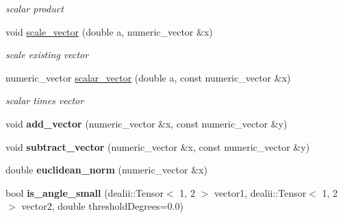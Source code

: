 \begin{DoxyCompactItemize}
\begin{DoxyCompactList}\small\item\em scalar product \item\end{DoxyCompactList}\item 
\hypertarget{namespacenatrium_1_1Math_a951fe967a78de6add632ac1944465bf3}{
void \hyperlink{namespacenatrium_1_1Math_a951fe967a78de6add632ac1944465bf3}{scale\_\-vector} (double a, numeric\_\-vector \&x)}
\label{namespacenatrium_1_1Math_a951fe967a78de6add632ac1944465bf3}

\begin{DoxyCompactList}\small\item\em scale existing vector \item\end{DoxyCompactList}\item 
\hypertarget{namespacenatrium_1_1Math_af6c85a423e8c6ec87858a3d48669a271}{
numeric\_\-vector \hyperlink{namespacenatrium_1_1Math_af6c85a423e8c6ec87858a3d48669a271}{scalar\_\-vector} (double a, const numeric\_\-vector \&x)}
\label{namespacenatrium_1_1Math_af6c85a423e8c6ec87858a3d48669a271}

\begin{DoxyCompactList}\small\item\em scalar times vector \item\end{DoxyCompactList}\item 
\hypertarget{namespacenatrium_1_1Math_adce2097ce0c14661aac3eaff3a03e183}{
void {\bfseries add\_\-vector} (numeric\_\-vector \&x, const numeric\_\-vector \&y)}
\label{namespacenatrium_1_1Math_adce2097ce0c14661aac3eaff3a03e183}

\item 
\hypertarget{namespacenatrium_1_1Math_aa836548ce124ae68fe267d0c988add9b}{
void {\bfseries subtract\_\-vector} (numeric\_\-vector \&x, const numeric\_\-vector \&y)}
\label{namespacenatrium_1_1Math_aa836548ce124ae68fe267d0c988add9b}

\item 
\hypertarget{namespacenatrium_1_1Math_a3fbf64e851a081a568d1fce928380074}{
double {\bfseries euclidean\_\-norm} (numeric\_\-vector \&x)}
\label{namespacenatrium_1_1Math_a3fbf64e851a081a568d1fce928380074}

\item 
\hypertarget{namespacenatrium_1_1Math_a5e27b57b0c8ef5db261c6fd6cc7f8b08}{
bool {\bfseries is\_\-angle\_\-small} (dealii::Tensor$<$ 1, 2 $>$ vector1, dealii::Tensor$<$ 1, 2 $>$ vector2, double thresholdDegrees=0.0)}
\label{namespacenatrium_1_1Math_a5e27b57b0c8ef5db261c6fd6cc7f8b08}


\end{DoxyCompactItemize}
